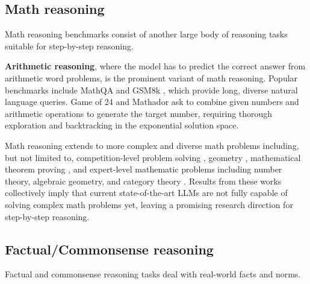 \subsection{Math reasoning}

Math reasoning benchmarks consist of another large body of reasoning tasks suitable for step-by-step reasoning. 

\textbf{Arithmetic reasoning}, where the model has to predict the correct answer from arithmetic word problems, is the prominent variant of math reasoning. Popular benchmarks include MathQA \citep{amini-etal-2019-mathqa} and GSM8k \citep{cobbe2021trainingverifierssolvemath}, which provide long, diverse natural language queries. Game of 24 \citep{NEURIPS2023_271db992} and Mathador \citep{kurtic-etal-2024-mathador} ask to combine given numbers and arithmetic operations to generate the target number, requiring thorough exploration and backtracking in the exponential solution space.

Math reasoning extends to more complex and diverse math problems including, but not limited to, competition-level problem solving \citep{NEURIPSDnB2021_be83ab3e, wang2024measuring}, geometry \citep{chen-etal-2021-geoqa, zhang-etal-2024-geoeval}, mathematical theorem proving \citep{yang2023leandojo, lama-etal-2024-benchmarking}, and expert-level mathematic problems including number theory, algebraic geometry, and category theory \citep{glazer2024frontiermathbenchmarkevaluatingadvanced}. Results from these works collectively imply that current state-of-the-art LLMs are not fully capable of solving complex math problems yet, leaving a promising research direction for step-by-step reasoning.

\subsection{Factual/Commonsense reasoning}


Factual and commonsense reasoning tasks deal with real-world facts and norms.

